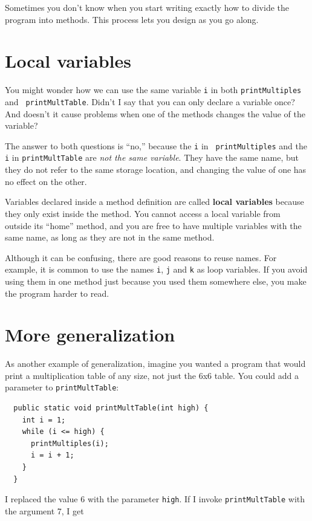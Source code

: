 \documentclass[12pt]{book}
\theoremstyle{exercise}
\begin{document}
Sometimes you don't know
when you start writing exactly how to divide the program into
methods.  This process lets you design as you go along.


\section{Local variables}

You might wonder how we can use the same
variable {\tt i} in both {\tt printMultiples} and {\tt
printMultTable}.  Didn't I say that you can only declare a variable
once?  And doesn't it cause problems when one of the methods changes
the value of the variable?

The answer to both questions is ``no,'' because the {\tt i} in {\tt
printMultiples} and the {\tt i} in {\tt printMultTable} are
{\em not the same variable}.  They have the same name, but
they do not refer to the same storage location, and changing
the value of one has no effect on the other.

Variables declared inside a method definition are
called {\bf local variables} because they only exist inside
the method.  You cannot access a local variable from outside
its ``home'' method, and you are free to have multiple
variables with the same name, as long as they are not in
the same method.

Although it can be confusing, there are good
reasons to reuse names.  For example, it is common to
use the names {\tt i}, {\tt j} and {\tt k} as loop variables.
If you avoid using them in one method just because you
used them somewhere else, you make the program
harder to read.


\section{More generalization}

As another example of generalization, imagine you wanted
a program that would print a multiplication table of any
size, not just the 6x6 table.  You could add a parameter to
{\tt printMultTable}:

\begin{lstlisting}
  public static void printMultTable(int high) {
    int i = 1;
    while (i <= high) {
      printMultiples(i);
      i = i + 1;
    }
  }
\end{lstlisting}
%
I replaced the value 6 with the parameter {\tt high}.  If I
invoke {\tt printMultTable} with the argument 7, I get
\end{document}
